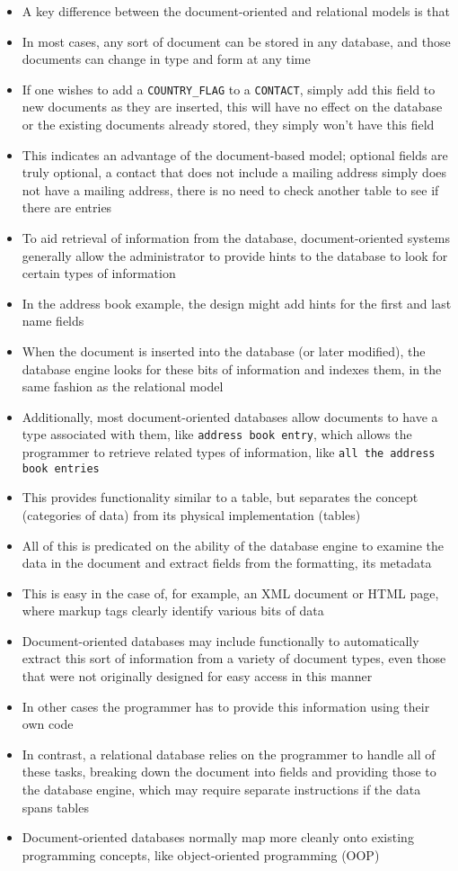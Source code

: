 \begin{itemize}
\item
A key difference between the document-oriented and relational models is
that 
\item
In most
cases, any sort of document can be stored in any database, and those
documents can change in type and form at any time
\item If one wishes to
add a \verb|COUNTRY_FLAG| to a \verb|CONTACT|, simply add this field to new documents
as they are inserted, this will have no effect on the database or the
existing documents already stored, they simply won't have this field
\item This
indicates an advantage of the document-based model; optional fields are
truly optional, a contact that does not include a mailing address simply
does not have a mailing address, there is no need to check another table
to see if there are entries
\item 
To aid retrieval of information from the database, document-oriented
systems generally allow the administrator to provide hints to the database
to look for certain types of information
\item In the address book example,
the design might add hints for the first and last name fields
\item When the
document is inserted into the database (or later modified), the database
engine looks for these bits of information and indexes them, in the same
fashion as the relational model
\item Additionally, most document-oriented
databases allow documents to have a type associated with them, like
\verb"address book entry", which allows the programmer to retrieve related
types of information, like \verb"all the address book entries"
\item This provides
functionality similar to a table, but separates the concept (categories
of data) from its physical implementation (tables)
\item 
All of this is predicated on the ability of the database engine
to examine the data in the document and extract fields from the
formatting, its metadata
\item This is easy in the case of, for example, an
XML document or HTML page, where markup tags clearly identify various
bits of data
\item Document-oriented databases may include functionally
to automatically extract this sort of information from a variety of
document types, even those that were not originally designed for easy
access in this manner
\item In other cases the programmer has to provide this
information using their own code
\item In contrast, a relational database
relies on the programmer to handle all of these tasks, breaking down
the document into fields and providing those to the database engine,
which may require separate instructions if the data spans tables
\item 
Document-oriented databases normally map more cleanly onto existing
programming concepts, like object-oriented programming (OOP)
\end{itemize}


